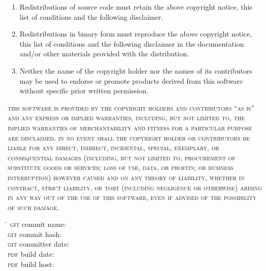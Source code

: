 \begin{enumerate}
\item Redistributions of source code must retain the above copyright notice,
      this list of conditions and the following disclaimer.

\item Redistributions in binary form must reproduce the above copyright notice,
      this list of conditions and the following disclaimer in the documentation
      and\slash or other materials provided with the distribution.

\item Neither the name of the copyright holder nor the names of its
      contributors may be used to endorse or promote products derived from
      this software without specific prior written permission.
\end{enumerate}

\begingroup%
%
\textsc{this software is provided by the copyright holders and contributors
``as is'' and any express or implied warranties, including, but not limited to,
the implied warranties of merchantability and fitness for a particular purpose
are disclaimed. in no event shall the copyright holder or contributors be
liable for any direct, indirect, incidental, special, exemplary, or
consequential damages (including, but not limited to, procurement of
substitute goods or services; loss of use, data, or profits; or business
interruption) however caused and on any theory of liability, whether in
contract, strict liability, or tort (including negligence or otherwise)
arising in any way out of the use of this software, even if advised of the
possibility of such damage.}

\endgroup

\vfill

\setlength{\parskip}{.3125\baselineskip}%
\vspace{-2\baselineskip}
\begin{tabbing}
\hspace{9.5625em}\= \kill
\textsc{git} commit name:       \>\texttt{\gitcommitname}\\
\textsc{git} commit hash:       \>\texttt{\gitcommithash}\\
\textsc{git} committer date:    \>\texttt{\gitcommitterdate}\\
\textsc{pdf} build date:        \>\texttt{\pdfbuilddate}\\
\textsc{pdf} build host:        \>\texttt{\pdfbuildhost}
\end{tabbing}
\vspace{-1\baselineskip}

